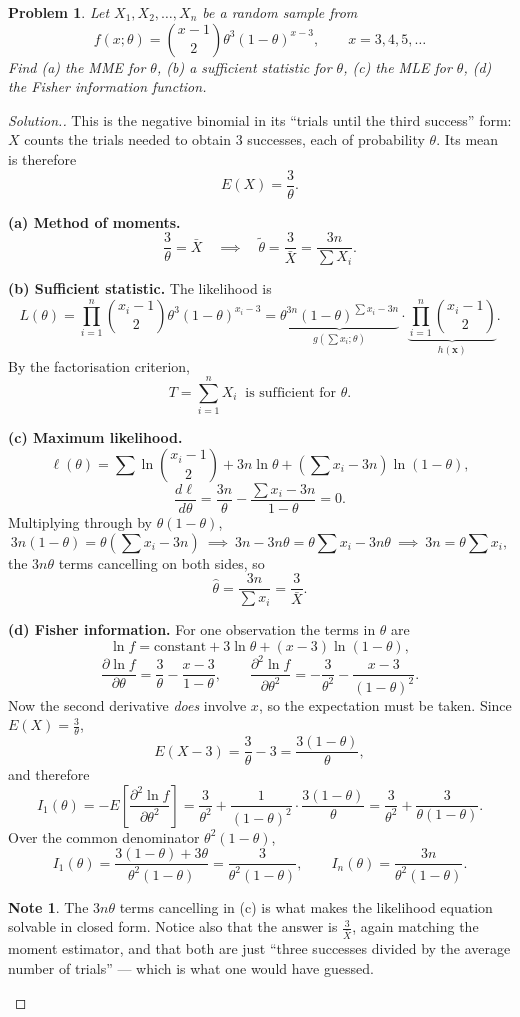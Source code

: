 \documentclass[12pt,a4paper]{report}
\theoremstyle{definition}
\newtheorem{note}[thm]{Note}
\theoremstyle{plain}
\newtheorem{problemx}{Problem}[section]
\newenvironment{problem}{\begin{problemx}}{\end{problemx}}
\newenvironment{solution}
  {\renewcommand{\qedsymbol}{}\begin{proof}[\textit{Solution}.]}
  {\end{proof}}
\begin{document}
\begin{problem}
Let $X_1,X_2,\ldots,X_n$ be a random sample from
\[f(x;\theta)=\binom{x-1}{2}\theta^3(1-\theta)^{x-3},\qquad x=3,4,5,\ldots\]
Find (a) the MME for $\theta$, (b) a sufficient statistic for $\theta$, (c) the MLE
for $\theta$, (d) the Fisher information function.
\end{problem}

\begin{solution}
This is the negative binomial in its ``trials until the third success'' form: $X$
counts the trials needed to obtain $3$ successes, each of probability $\theta$. Its
mean is therefore
\[E(X)=\frac{3}{\theta}.\]

\textbf{(a) Method of moments.}
\[\frac{3}{\theta}=\bar X\quad\implies\quad \tilde\theta=\frac{3}{\bar X}
=\frac{3n}{\sum X_i}.\]

\textbf{(b) Sufficient statistic.} The likelihood is
\[L(\theta)=\prod_{i=1}^n\binom{x_i-1}{2}\theta^3(1-\theta)^{x_i-3}
=\underbrace{\theta^{3n}(1-\theta)^{\sum x_i-3n}}_{g\left(\sum x_i;\theta\right)}
\cdot\underbrace{\prod_{i=1}^n\binom{x_i-1}{2}}_{h(\mathbf{x})}.\]
By the factorisation criterion,
\[T=\sum_{i=1}^n X_i\ \text{ is sufficient for }\theta.\]

\textbf{(c) Maximum likelihood.}
\[\ell(\theta)=\sum\ln\binom{x_i-1}{2}+3n\ln\theta+\left(\sum x_i-3n\right)\ln(1-\theta),\]
\[\frac{d\ell}{d\theta}=\frac{3n}{\theta}-\frac{\sum x_i-3n}{1-\theta}=0.\]
Multiplying through by $\theta(1-\theta)$,
\[3n(1-\theta)=\theta\left(\sum x_i-3n\right)
\ \implies\ 3n-3n\theta=\theta\sum x_i-3n\theta
\ \implies\ 3n=\theta\sum x_i,\]
the $3n\theta$ terms cancelling on both sides, so
\[\hat\theta=\frac{3n}{\sum x_i}=\frac{3}{\bar X}.\]

\textbf{(d) Fisher information.} For one observation the terms in $\theta$ are
\[\ln f=\text{constant}+3\ln\theta+(x-3)\ln(1-\theta),\]
\[\frac{\partial\ln f}{\partial\theta}=\frac{3}{\theta}-\frac{x-3}{1-\theta},
\qquad
\frac{\partial^2\ln f}{\partial\theta^2}=-\frac{3}{\theta^2}-\frac{x-3}{(1-\theta)^2}.\]
Now the second derivative \emph{does} involve $x$, so the expectation must be taken.
Since $E(X)=\frac{3}{\theta}$,
\[E(X-3)=\frac{3}{\theta}-3=\frac{3(1-\theta)}{\theta},\]
and therefore
\[I_1(\theta)=-E\!\left[\frac{\partial^2\ln f}{\partial\theta^2}\right]
=\frac{3}{\theta^2}+\frac{1}{(1-\theta)^2}\cdot\frac{3(1-\theta)}{\theta}
=\frac{3}{\theta^2}+\frac{3}{\theta(1-\theta)}.\]
Over the common denominator $\theta^2(1-\theta)$,
\[I_1(\theta)=\frac{3(1-\theta)+3\theta}{\theta^2(1-\theta)}
=\frac{3}{\theta^2(1-\theta)},\qquad
I_n(\theta)=\frac{3n}{\theta^2(1-\theta)}.\]

\begin{note}
The $3n\theta$ terms cancelling in (c) is what makes the likelihood equation
solvable in closed form. Notice also that the answer is $\frac{3}{\bar X}$, again
matching the moment estimator, and that both are just ``three successes divided by
the average number of trials'' --- which is what one would have guessed.
\end{note}
\end{solution}
\end{document}
